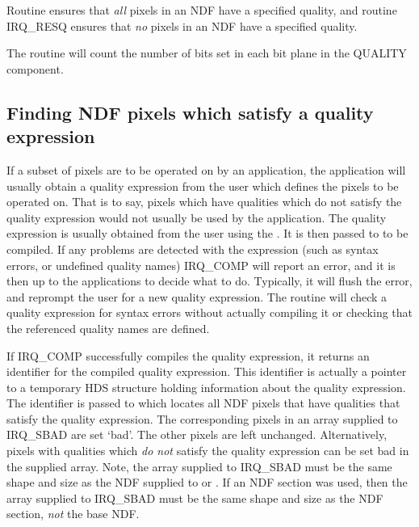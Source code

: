 \documentclass[twoside,11pt,nolof]{starlink}
\begin{document}
Routine  ensures that \emph{all} pixels in an
NDF have a specified quality, and routine IRQ\_RESQ ensures that \emph{no}
pixels in an NDF have a specified quality.

The routine  will count the number of bits
set in each bit plane in the QUALITY component.

\subsection{Finding NDF pixels which satisfy a quality expression}
\label {SEC:QFIND}

If a subset of pixels are to be operated on by an application, the
application will usually obtain a quality expression from the user which
defines the pixels to be operated on. That is to say, pixels which have
qualities which do not satisfy the quality expression would not usually
be used by the application. The quality expression is usually obtained
from the user using the . It is
then passed to  to be compiled. If any
problems are detected with the expression (such as syntax errors, or
undefined quality names) IRQ\_COMP will report an error, and it is then
up to the applications to decide what to do. Typically, it will flush the
error, and reprompt the user for a new quality expression. The routine
 will check a quality expression for
syntax errors without actually compiling it or checking that the
referenced quality names are defined.

If IRQ\_COMP successfully compiles the quality expression, it returns an
identifier for the compiled quality expression. This identifier is
actually a pointer to a temporary HDS structure holding information about
the quality expression. The identifier is passed to
 which locates all NDF pixels that have
qualities that satisfy the quality expression. The corresponding pixels
in an array supplied to IRQ\_SBAD are set `bad'. The other pixels are
left unchanged. Alternatively, pixels with qualities which \emph{do not}
satisfy the quality expression can be set bad in the supplied array.
Note, the array supplied to IRQ\_SBAD must be the same shape and size as
the NDF supplied to  or
. If an NDF section was used, then the array
supplied to IRQ\_SBAD must be the same shape and size as the NDF section,
\emph{not} the base NDF.
\end{document}
